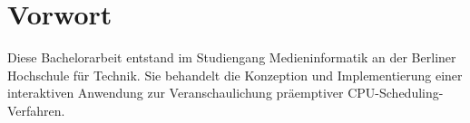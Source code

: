 \chapter*{Vorwort}

Diese Bachelorarbeit entstand im Studiengang Medieninformatik an der Berliner Hochschule für Technik. Sie behandelt die Konzeption und Implementierung einer interaktiven Anwendung zur Veranschaulichung präemptiver CPU-Scheduling-Verfahren.